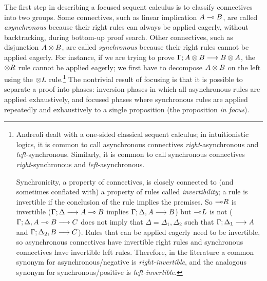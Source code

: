 The first step in describing a focused sequent calculus is to classify
connectives into two groups.  Some connectives, such as linear
implication $A \multimap B$, are called {\it asynchronous} because their
right rules can always be applied eagerly, without backtracking,
during bottom-up proof search. Other connectives, such as disjunction
$A \otimes B$, are called {\it synchronous} because their right rules
cannot be applied eagerly. For instance, if we are trying to prove
${\Gamma};{A \otimes B} \longrightarrow {B \otimes A} \mathstrut$, the ${\otimes}R$ rule cannot
be applied eagerly; we first have to decompose $A \otimes B$ on the
left using the ${\otimes}L$ rule.\footnote{Andreoli dealt with a
  one-sided classical sequent calculus; in intuitionistic logics, it
  is common to call asynchronous connectives {\it right}-asynchronous
  and {\it left}-synchronous. Similarly, it is common to call
  synchronous connectives {\it right}-synchronous and {\it
    left}-asynchronous.

  Synchronicity, a property of connectives, is closely connected to
  (and sometimes conflated with) a property of rules called {\it
    invertibility}; a rule is invertible if the conclusion of the rule
  implies the premises. So ${\multimap}R$ is invertible
  (${\Gamma};{\Delta} \longrightarrow {A \multimap B} \mathstrut$ implies ${\Gamma};{\Delta,
    A} \longrightarrow {B} \mathstrut$) but ${\multimap}L$ is not (${\Gamma};{\Delta, A \multimap
    B} \longrightarrow {C} \mathstrut$ does not imply that $\Delta = \Delta_1, \Delta_2$ such that
  ${\Gamma};{\Delta_1} \longrightarrow {A} \mathstrut$ and ${\Gamma};{\Delta_2, B} \longrightarrow {C} \mathstrut$).
  Rules that can be applied eagerly need to be invertible, so
  asynchronous connectives have invertible right rules and synchronous
  connectives have invertible left rules. Therefore, in the literature
  a common synonym for asynchronous/negative is {\it
    right-invertible}, and the analogous synonym for
  synchronous/positive is {\it left-invertible}.}  The nontrivial
result of focusing is that it is possible to separate a proof into
phases: inversion phases in which all asynchronous rules are applied
exhaustively, and focused phases where synchronous rules are applied
repeatedly and exhaustively to a single proposition (the proposition
{\it in focus}).

